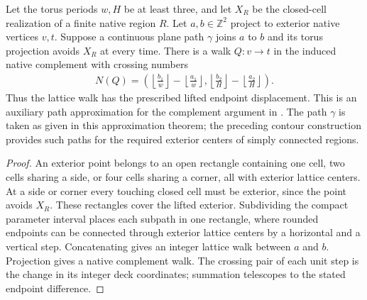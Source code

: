 \begin{lemma}%
    \label{thm:peps_torus_exterior_path_approximation}
    \leanok
    Let the torus periods $w,H$ be at least three, and let $X_R$ be
    the closed-cell realization of a finite native region $R$.
    Let $a,b\in\mathbb Z^2$ project to exterior native vertices $v,t$.
    Suppose a continuous plane path $\gamma$ joins $a$ to $b$ and
    its torus projection avoids $X_R$ at every time. There is a walk
    $Q:v\to t$ in the induced native complement with crossing numbers
    \begin{align}
        N(Q)=\left(
        \left\lfloor\frac{b_1}{w}\right\rfloor
        -\left\lfloor\frac{a_1}{w}\right\rfloor,
        \left\lfloor\frac{b_2}{H}\right\rfloor
        -\left\lfloor\frac{a_2}{H}\right\rfloor
        \right).
    \end{align}
    Thus the lattice walk has the prescribed lifted endpoint displacement.
    This is an auxiliary path approximation for the complement argument
    in \cite[proof of Theorem~6.9]{Schuch2010PEPS}. The path $\gamma$ is taken as given in this approximation theorem;
    the preceding contour construction provides such paths for the
    required exterior centers of simply connected regions.
\end{lemma}
\begin{proof}\leanok
    An exterior point belongs to an open rectangle containing one cell,
    two cells sharing a side, or four cells sharing a corner, all with
    exterior lattice centers. At a side or corner every touching closed
    cell must be exterior, since the point avoids $X_R$. These rectangles
    cover the lifted exterior. Subdividing the compact parameter interval
    places each subpath in one rectangle, where rounded endpoints
    can be connected through exterior lattice centers
    by a horizontal and a vertical step. Concatenating gives an integer
    lattice walk between $a$ and $b$. Projection gives a native
    complement walk. The crossing pair of each unit step is the change
    in its integer deck coordinates; summation telescopes to the stated
    endpoint difference.
\end{proof}

